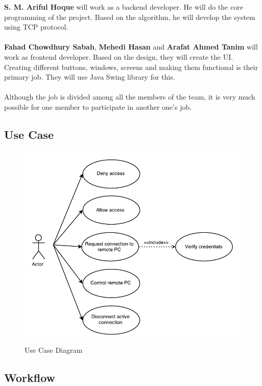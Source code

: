 \documentclass[12pt, a4paper]{article}
\begin{document}
\textbf{S. M. Ariful Hoque} will work as a backend developer. He will do the core programming of the project. Based on the algorithm, he will develop the system using TCP protocol.\\ \\
\textbf{Fahad Chowdhury Sabah}, \textbf{Mehedi Hasan} and \textbf{Arafat Ahmed Tanim} will work as frontend developer. Based on the design, they will create the UI. Creating different buttons, windows, screens and making them functional is their primary job. They will use Java Swing library for this.\\ \\
Although the job is divided among all the members of the team, it is very much possible for one member to participate in another one's job.

\subsection{Use Case}

\begin{figure}[h!]
\centering
\includegraphics[scale=1]{remote-pc-controller-usecase}
\caption{Use Case Diagram}
\end{figure}

\newpage

\subsection{Workflow}
\end{document}
